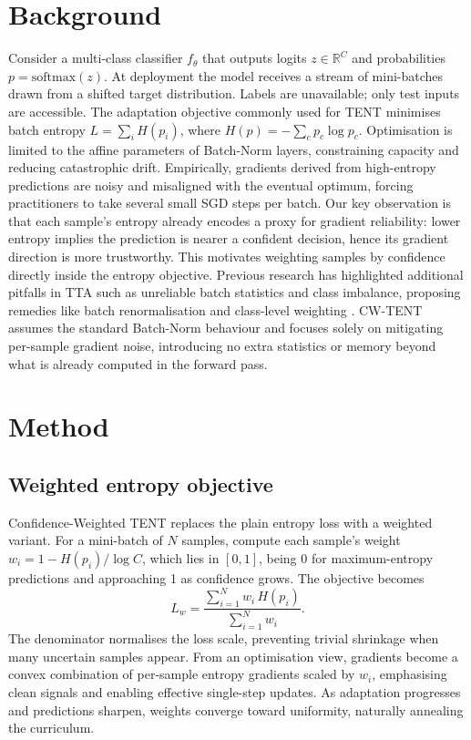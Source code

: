 \documentclass{article} %
\begin{document}
\section{Background}
\label{sec:background}
Consider a multi-class classifier \(f_{\theta}\) that outputs logits \(z \in \mathbb{R}^C\) and probabilities \(p = \mathrm{softmax}(z)\). At deployment the model receives a stream of mini-batches drawn from a shifted target distribution. Labels are unavailable; only test inputs are accessible. The adaptation objective commonly used for TENT minimises batch entropy \(L = \sum_{i} H(p_i)\), where \(H(p) = -\sum_{c} p_c \log p_c\). Optimisation is limited to the affine parameters of Batch-Norm layers, constraining capacity and reducing catastrophic drift.
Empirically, gradients derived from high-entropy predictions are noisy and misaligned with the eventual optimum, forcing practitioners to take several small SGD steps per batch. Our key observation is that each sample's entropy already encodes a proxy for gradient reliability: lower entropy implies the prediction is nearer a confident decision, hence its gradient direction is more trustworthy. This motivates weighting samples by confidence directly inside the entropy objective.
Previous research has highlighted additional pitfalls in TTA such as unreliable batch statistics and class imbalance, proposing remedies like batch renormalisation and class-level weighting \cite{zhao-2023-delta}. CW-TENT assumes the standard Batch-Norm behaviour and focuses solely on mitigating per-sample gradient noise, introducing no extra statistics or memory beyond what is already computed in the forward pass.

\section{Method}
\label{sec:method}
\subsection{Weighted entropy objective}
Confidence-Weighted TENT replaces the plain entropy loss with a weighted variant. For a mini-batch of \(N\) samples, compute each sample's weight \(w_i = 1 - H(p_i)/\log C\), which lies in \([0,1]\), being 0 for maximum-entropy predictions and approaching 1 as confidence grows. The objective becomes
\[
L_w = \frac{\sum_{i=1}^{N} w_i\, H(p_i)}{\sum_{i=1}^{N} w_i} .
\]
The denominator normalises the loss scale, preventing trivial shrinkage when many uncertain samples appear. From an optimisation view, gradients become a convex combination of per-sample entropy gradients scaled by \(w_i\), emphasising clean signals and enabling effective single-step updates. As adaptation progresses and predictions sharpen, weights converge toward uniformity, naturally annealing the curriculum.
\end{document}
